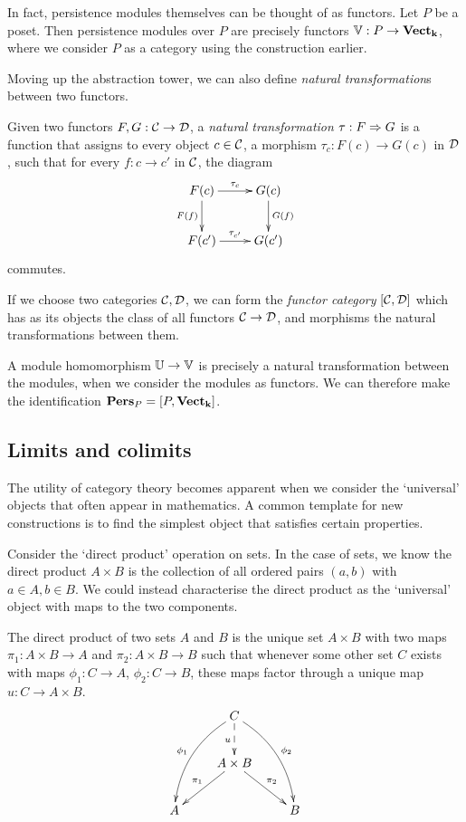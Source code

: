 In fact, persistence modules themselves can be thought of as functors. Let $P$ be a poset. Then persistence modules over $P$ are precisely functors $\mathbb{V} : P \to \mathbf{Vect}_{\mathbf{k}}$, where we consider $P$ as a category using the construction earlier.

Moving up the abstraction tower, we can also define \emph{natural transformation}s between two functors.

\begin{definition}
Given two functors $F, G : \mathcal{C} \to \mathcal{D}$, a \emph{natural transformation} $\tau : F \Rightarrow G$ is a function that assigns to every object $c \in \mathcal{C}$, a morphism $\tau_c : F(c) \to G(c)$ in $\mathcal{D}$, such that for every $f : c \to c'$ in $\mathcal{C}$, the diagram
\begin{displaymath}
\xymatrix{
F(c) \ar[d]_{F(f)} \ar[r]^{\tau_c} & G(c) \ar[d]^{G(f)}\\
F(c') \ar[r]^{\tau_{c'}} & G(c')
}
\end{displaymath}
commutes.
\end{definition}

If we choose two categories $\mathcal{C}, \mathcal{D}$, we can form the \emph{functor category} $[\mathcal{C}, \mathcal{D}]$ which has as its objects the class of all functors $\mathcal{C} \to \mathcal{D}$, and morphisms the natural transformations between them.
 
A module homomorphism $\mathbb{U} \to \mathbb{V}$ is precisely a natural transformation between the modules, when we consider the modules as functors. We can therefore make the identification $\mathbf{Pers}_P = [P, \mathbf{Vect}_{\mathbf{k}}]$.

\subsection{Limits and colimits}

The utility of category theory becomes apparent when we consider the `universal' objects that often appear in mathematics. A common template for new constructions is to find the simplest object that satisfies certain properties. 

Consider the `direct product' operation on sets. In the case of sets, we know the direct product $A \times B$ is the collection of all ordered pairs $(a, b)$ with $a \in A, b \in B$. We could instead characterise the direct product as the `universal' object with maps to the two components.

\begin{definition}
The direct product of two sets $A$ and $B$ is the unique set $A \times B$ with two maps $\pi_1 : A \times B \to A$ and $\pi_2 : A \times B \to B$ such that whenever some other set $C$ exists with maps $\phi_1 : C \to A$, $\phi_2 : C \to B$, these maps factor through a unique map $u : C \to A \times B$.
\begin{displaymath}
\xymatrix{
& C \ar@/_1pc/[ddl]_{\phi_1} \ar@/^1pc/[ddr]^{\phi_2} \ar@{-->}[d]_u & \\
& A \times B \ar[dl]_{\pi_1} \ar[dr]^{\pi_2} & \\
A & & B
}
\end{displaymath}
\end{definition}

